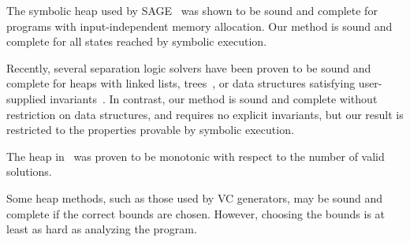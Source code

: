 %
The symbolic heap used by SAGE~\cite{Elkarablieh:2009} was shown to be sound and complete for programs with input-independent memory allocation. Our method is sound and complete for all states reached by symbolic execution. 

Recently, several separation logic solvers have been proven to be sound and complete for heaps with linked lists, trees~\cite{Piskac:2014}, or data structures satisfying user-supplied invariants~\cite{Brotherston:2014}. In contrast, our method is sound and complete without restriction on data structures, and requires no explicit invariants, but our result is restricted to the properties provable by symbolic execution. 

The heap in~\cite{Dillig:2011} was proven to be monotonic with respect to the number of valid solutions. 

Some heap methods, such as those used by VC generators, may be sound and complete if the correct bounds are chosen. However, choosing the bounds is at least as hard as analyzing the program. 






%
%
%

%
%
%
%
%
